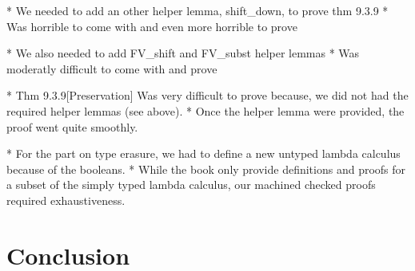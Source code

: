 \documentclass[a4paper, oneside, 12pt, titlepage]{article}
\begin{document}
  * We needed to add an other helper lemma, shift\_down, to prove thm 9.3.9
    * Was horrible to come with and even more horrible to prove

  * We also needed to add FV\_shift and FV\_subst helper lemmas
    * Was moderatly difficult to come with and prove

  * Thm 9.3.9[Preservation] Was very difficult to prove because, we did not had the required helper
    lemmas (see above).
    * Once the helper lemma were provided, the proof went quite smoothly.

  * For the part on type erasure, we had to define a new untyped lambda calculus because of the
    booleans.
    * While the book only provide definitions and proofs for a subset of the simply typed lambda
      calculus, our machined checked proofs required exhaustiveness.

\section{Conclusion}
\end{document}

